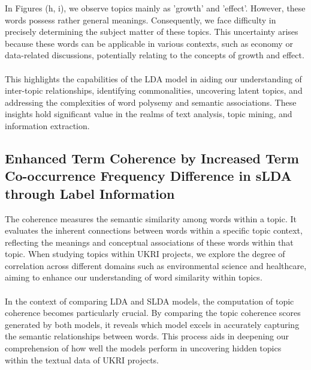 \documentclass[12pt,twoside]{article}
\begin{document}
In Figures (h, i), we observe topics mainly as 'growth' and 'effect'. However, these words possess rather general meanings. Consequently, we face difficulty in precisely determining the subject matter of these topics. This uncertainty arises because these words can be applicable in various contexts, such as economy or data-related discussions, potentially relating to the concepts of growth and effect.\\\\


This highlights the capabilities of the LDA model in aiding our understanding of inter-topic relationships, identifying commonalities, uncovering latent topics, and addressing the complexities of word polysemy and semantic associations. These insights hold significant value in the realms of text analysis, topic mining, and information extraction.

\subsection{Enhanced Term Coherence by Increased Term Co-occurrence Frequency Difference in sLDA through Label Information}

The coherence measures the semantic similarity among words within a topic. It evaluates the inherent connections between words within a specific topic context, reflecting the meanings and conceptual associations of these words within that topic. When studying topics within UKRI projects, we explore the degree of correlation across different domains such as environmental science and healthcare, aiming to enhance our understanding of word similarity within topics.\\\\

In the context of comparing LDA and SLDA models, the computation of topic coherence becomes particularly crucial. By comparing the topic coherence scores generated by both models, it reveals which model excels in accurately capturing the semantic relationships between words. This process aids in deepening our comprehension of how well the models perform in uncovering hidden topics within the textual data of UKRI projects.\\\\
\end{document}
